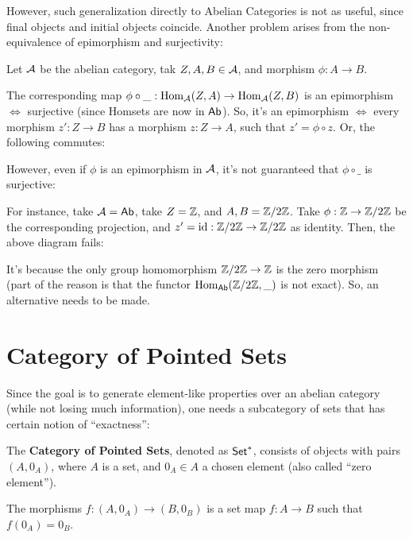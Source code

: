 \documentclass{article}
\begin{document}
However, such generalization directly to Abelian Categories is not as useful, since final objects and initial objects coincide. Another problem arises from the non-equivalence of epimorphism and surjectivity:
\begin{exm}
    Let $\cal{A}$ be the abelian category, tak $Z,A,B \in \cal{A}$, and morphism $\phi:A\rightarrow B$.

    The corresponding map $\phi\circ\_:\mathrm{Hom}_{\cal{A}}(Z,A)\rightarrow\mathrm{Hom}_{\cal{A}}(Z,B)$ is an epimorphism $\iff$ surjective (since Homsets are now in $\mathsf{Ab}$). So, it's an epimorphism $\iff$ every morphism $z':Z\rightarrow B$ has a morphism $z:Z\rightarrow A$, such that $z' = \phi \circ z$. Or, the following commutes:
    \begin{center}
    \end{center}

    However, even if $\phi$ is an epimorphism in $\cal{A}$, it's not guaranteed that $\phi \circ \_$ is surjective:

    For instance, take $\cal{A}=\mathsf{Ab}$, take $Z=\mathbb{Z}$, and $A,B=\mathbb{Z}/2\mathbb{Z}$. Take $\phi:\mathbb{Z}\rightarrow\mathbb{Z}/2\mathbb{Z}$ be the corresponding projection, and $z' = \mathrm{id}:\mathbb{Z}/2\mathbb{Z}\rightarrow \mathbb{Z}/2\mathbb{Z}$ as identity. Then, the above diagram fails:
    \begin{center}
    \end{center}
\end{exm}

It's because the only group homomorphism $\mathbb{Z}/2\mathbb{Z}\rightarrow \mathbb{Z}$ is the zero morphism (part of the reason is that the functor $\mathrm{Hom}_{\mathsf{Ab}}(\mathbb{Z}/2\mathbb{Z},\_)$ is not exact). So, an alternative needs to be made.

\hfil

\section{Category of Pointed Sets}

Since the goal is to generate element-like properties over an abelian category (while not losing much information), one needs a subcategory of sets that has certain notion of ``exactness'':
\begin{defn}
    The \textbf{Category of Pointed Sets}, denoted as $\mathsf{Set}^*$, consists of objects with pairs $(A,0_A)$, where $A$ is a set, and $0_A\in A$ a chosen element (also called ``zero element'').

    The morphisms $f:(A,0_A)\rightarrow (B,0_B)$ is a set map $f:A\rightarrow B$ such that $f(0_A)=0_B$.
\end{defn}
\end{document}
